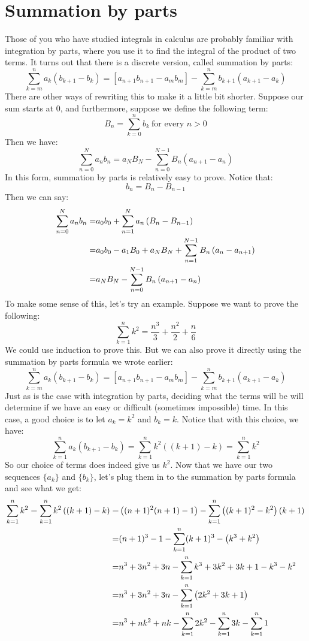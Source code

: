\section{Summation by parts}
Those of you who have studied integrals in calculus are probably familiar with integration by parts, where you use it to find the integral of the product of two terms.  It turns out that there is a discrete version, called summation by parts:
\[ \sum_{k=m}^n a_k \left(b_{k+1} - b_k \right)   = \left[a_{n+1} b_{n+1} - a_m b_m \right] - \sum_{k=m}^n b_{k+1} \left(a_{k+1} - a_k \right) \]
There are other ways of rewriting this to make it a little bit shorter.  Suppose our sum starts at 0, and furthermore, suppose we define the following term:
\[ B_n = \sum_{k=0}^n b_k ~\text{for every $n > 0$} \]
Then we have:
\[ \sum_{n=0}^N a_n b_n = a_N B_N - \sum_{n=0}^{N-1} B_n \left(a_{n+1} - a_n \right) \]
In this form, summation by parts is relatively easy to prove.  Notice that:
\[ b_n = B_n - B_{n-1} \]
Then we can say:
\begin{align}
 \sum_{n=0}^N a_n b_n =& a_0 b_0 + \sum_{n=1}^N  a_n \left(B_n - B_{n-1} \right) \notag\\
=& a_0 b_0 - a_1B_0 + a_N B_N + \sum_{n=1}^{N-1} B_n \left( a_n - a_{n+1}\right) \notag\\
=&  a_N B_N - \sum_{n=0}^{N-1} B_n \left(a_{n+1} - a_n \right) \notag
\end{align}
To make some sense of this, let's try an example.  Suppose we want to prove the following:
\[ \sum_{k=1}^n k^2 = \frac{n^3}{3} + \frac{n^2}{2} + \frac{n}{6} \]
We could use induction to prove this. But we can also prove it directly using the summation by parts formula we wrote earlier:
\[ \sum_{k=m}^n a_k \left(b_{k+1} - b_k \right)   = \left[a_{n+1} b_{n+1} - a_m b_m \right] - \sum_{k=m}^n b_{k+1} \left(a_{k+1} - a_k \right) \]
Just as is the case with integration by parts, deciding what the terms will be will determine if we have an easy or difficult (sometimes impossible) time.  In this case, a good choice is to let $a_k=k^2$ and $b_k=k$.  Notice that with this choice, we have:
\[ \sum_{k=1}^n a_k \left(b_{k+1} - b_k \right)   = \sum_{k=1}^n k^2 \left((k+1) - k \right) = \sum_{k=1}^n k^2 \]
So our choice of terms does indeed give us $k^2$.  Now that we have our two sequences $\{a_k\}$ and $\{b_k\}$, let's plug them in to the summation by parts formula and see what we get:
\begin{align}
\sum_{k=1}^n k^2 = \sum_{k=1}^n k^2 \left((k+1) - k \right) =& \left((n+1)^2(n+1)-1 \right) - \sum_{k=1}^n \left((k+1)^2-k^2 \right)(k+1) \notag\\
=& (n+1)^3 - 1 - \sum_{k=1}^n (k+1)^3 - \left( k^3 + k^2 \right) \notag\\
=& n^3 + 3n^2 + 3n - \sum_{k=1}^n k^3 +3k^2 +3k +1 - k^3 - k^2 \notag\\
=&n^3 + 3n^2 + 3n  - \sum_{k=1}^n \left( 2k^2 + 3k +1\right) \notag\\
=& n^3 + nk^2 + nk - \sum_{k=1}^n 2k^2 - \sum_{k=1}^n 3k - \sum_{k=1}^n 1 \notag
\end{align}
